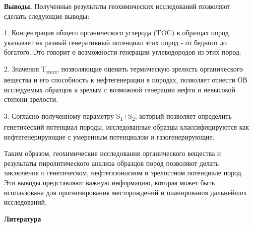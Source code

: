 {\bfseries Выводы.} Полученные результаты геохимических исследований
позволяют сделать следующие выводы:

1. Концентрация общего органического углерода (TOC) в образцах пород
указывает на разный генеративный потенциал этих пород - от бедного до
богатого. Это говорит о возможности генерации углеводородов из этих
пород.

2. Значения T\textsubscript{max}, позволяющие оценить термическую
зрелость органического вещества и его способность к нефтегенерации в
породах, позволяет отнести ОВ исследуемых образцов к зрелым с возможной
генерации нефти и невысокой степени зрелости.

3. Согласно полученному параметру S\textsubscript{1}+S\textsubscript{2},
который позволяет определить генетический потенциал породы,
исследованные образцы классифицируются как нефтегенерирующие с умеренным
потенциалом и газогенерирующие.

Таким образом, геохимические исследования органического вещества и
результаты пиролитического анализа образцов пород позволяют делать
заключения о генетическом, нефтегазоносном и зрелостном потенциале
пород. Эти выводы представляют важную информацию, которая может быть
использована для прогнозирования месторождений и планирования дальнейших
исследований.

{\bfseries Литература}

